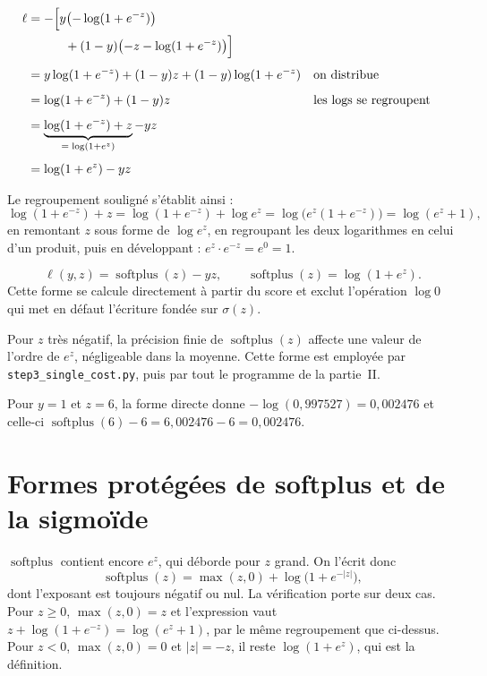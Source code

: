 \slidebreak

\begin{align}
  \ell &= -\Bigl[y\bigl(-\log(1+e^{-z})\bigr) \notag\\
    &\qquad\quad +(1-y)\bigl(-z-\log(1+e^{-z})\bigr)\Bigr] \notag\\[4pt]
  &= y\log(1+e^{-z})+(1-y)z+(1-y)\log(1+e^{-z})
    &&\text{on distribue} \notag\\[4pt]
  &= \log(1+e^{-z})+(1-y)z
    &&\text{les logs se regroupent} \notag\\[4pt]
  &= \underbrace{\log(1+e^{-z})+z}_{=\;\log(1+e^{z})}-yz \notag\\[4pt]
  &= \log(1+e^{z})-yz
\end{align}

Le regroupement souligné s'établit ainsi :
\[
  \log(1+e^{-z})+z
  = \log(1+e^{-z})+\log e^{z}
  = \log\bigl(e^{z}(1+e^{-z})\bigr)
  = \log(e^{z}+1),
\]
en remontant $z$ sous forme de $\log e^{z}$, en regroupant les deux logarithmes
en celui d'un produit, puis en développant : $e^{z}\cdot e^{-z}=e^{0}=1$.

\begin{resultat}
\[
  \ell(y,z)=\operatorname{softplus}(z)-yz,
  \qquad \operatorname{softplus}(z)=\log(1+e^{z}).
\]
Cette forme se calcule directement à partir du score et exclut l'opération
$\log 0$ qui met en défaut l'écriture fondée sur $\sigma(z)$.

Pour $z$ très négatif, la précision finie de
$\operatorname{softplus}(z)$ affecte une valeur de l'ordre de $e^z$,
négligeable dans la moyenne. Cette forme est employée par
\texttt{step3\_single\_cost.py}, puis par tout le programme de la partie~II.
\end{resultat}

\begin{releve}
Pour $y=1$ et $z=6$, la forme directe donne $-\log(0{,}997527)=0{,}002476$ et
celle-ci $\operatorname{softplus}(6)-6=6{,}002476-6=0{,}002476$.
\end{releve}

\section{Formes protégées de softplus et de la sigmoïde}

$\operatorname{softplus}$ contient encore $e^{z}$, qui déborde pour $z$ grand.
On l'écrit donc
\[
  \operatorname{softplus}(z)=\max(z,0)+\log\bigl(1+e^{-|z|}\bigr),
\]
dont l'exposant est toujours négatif ou nul. La vérification porte sur deux cas.
Pour $z\geq0$, $\max(z,0)=z$ et l'expression vaut
$z+\log(1+e^{-z})=\log(e^{z}+1)$, par le même regroupement que ci-dessus. Pour
$z<0$, $\max(z,0)=0$ et $|z|=-z$, il reste $\log(1+e^{z})$, qui est la
définition.

